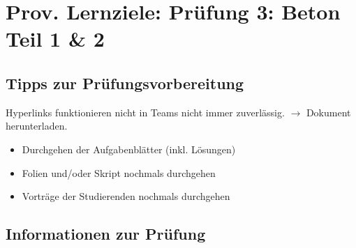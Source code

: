 



\newcommand{\blattname}{Prov. Lernziele: Prüfung 3: Beton Teil 1 \& 2}
\newcommand{\nrPruefung}{dritten}
\newcommand{\Added}[1]{\textcolor{blue}{#1}}



\section*{\blattname}
\subsection*{Tipps zur Prüfungsvorbereitung}
Hyperlinks funktionieren nicht in Teams nicht immer zuverlässig. $\rightarrow$ Dokument herunterladen.
\begin{itemize}
	\item Durchgehen der Aufgabenblätter (inkl. Lösungen)

 	\item Folien und/oder Skript nochmals durchgehen
 	\item Vorträge der Studierenden nochmals durchgehen
\end{itemize}

\subsection*{Informationen zur Prüfung}

